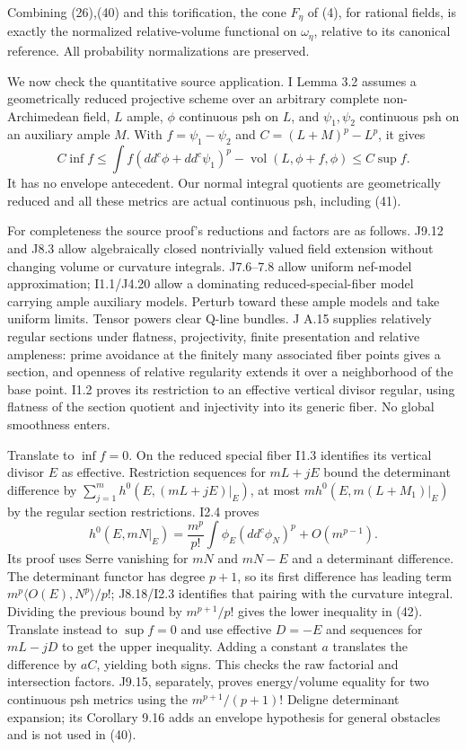 \documentclass[
  10pt,
]{article}
\begin{document}
Combining (26),(40) and this torification, the cone \(F_\eta\) of (4),
for rational fields, is exactly the normalized relative-volume
functional on \(\omega_\eta\), relative to its canonical reference. All
probability normalizations are preserved.

We now check the quantitative source application. I Lemma 3.2 assumes a
geometrically reduced projective scheme over an arbitrary complete
non-Archimedean field, \(L\) ample, \(\phi\) continuous psh on \(L\),
and \(\psi_1,\psi_2\) continuous psh on an auxiliary ample \(M\). With
\(f=\psi_1-\psi_2\) and \(C=(L+M)^p-L^p\), it gives
\[ C\inf f\leq\int f(dd^c\phi+dd^c\psi_1)^p-\operatorname{vol}(L,\phi+f,\phi)\leq C\sup f.          \tag{42}\]
It has no envelope antecedent. Our normal integral quotients are
geometrically reduced and all these metrics are actual continuous psh,
including (41).

For completeness the source proof's reductions and factors are as
follows. J9.12 and J8.3 allow algebraically closed nontrivially valued
field extension without changing volume or curvature integrals.
J7.6--7.8 allow uniform nef-model approximation; I1.1/J4.20 allow a
dominating reduced-special-fiber model carrying ample auxiliary models.
Perturb toward these ample models and take uniform limits. Tensor powers
clear Q-line bundles. J A.15 supplies relatively regular sections under
flatness, projectivity, finite presentation and relative ampleness:
prime avoidance at the finitely many associated fiber points gives a
section, and openness of relative regularity extends it over a
neighborhood of the base point. I1.2 proves its restriction to an
effective vertical divisor regular, using flatness of the section
quotient and injectivity into its generic fiber. No global smoothness
enters.

Translate to \(\inf f=0\). On the reduced special fiber I1.3 identifies
its vertical divisor \(E\) as effective. Restriction sequences for
\(mL+jE\) bound the determinant difference by
\(\sum_{j=1}^m h^0(E,(mL+jE)|_E)\), at most \(m h^0(E,m(L+M_1)|_E)\) by
the regular section restrictions. I2.4 proves
\[ h^0(E,mN|_E)=\frac{m^p}{p!}\int\phi_E(dd^c\phi_N)^p+O(m^{p-1}). \]
Its proof uses Serre vanishing for \(mN\) and \(mN-E\) and a determinant
difference. The determinant functor has degree \(p+1\), so its first
difference has leading term \(m^p\langle O(E),N^p\rangle/p!\);
J8.18/I2.3 identifies that pairing with the curvature integral. Dividing
the previous bound by \(m^{p+1}/p!\) gives the lower inequality in (42).
Translate instead to \(\sup f=0\) and use effective \(D=-E\) and
sequences for \(mL-jD\) to get the upper inequality. Adding a constant
\(a\) translates the difference by \(aC\), yielding both signs. This
checks the raw factorial and intersection factors. J9.15, separately,
proves energy/volume equality for two continuous psh metrics using the
\(m^{p+1}/(p+1)!\) Deligne determinant expansion; its Corollary 9.16
adds an envelope hypothesis for general obstacles and is not used in
(40).
\end{document}
